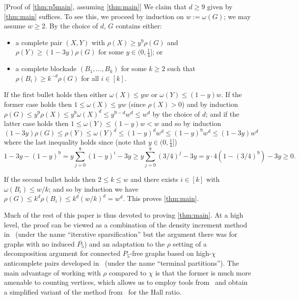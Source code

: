 \documentclass[11pt,reqno]{amsart}
\let\oldendproof\endproof
\renewenvironment{proof}[1][\proofname]{%
	\oldproof[\normalfont\bfseries #1]%
}{\oldendproof}
\begin{document}
	\begin{proof}
		[Proof of \cref{thm:p5main}, assuming \cref{thm:main}]
		We claim that $d\ge9$ given by \cref{thm:main} suffices.
		To see this, we proceed by induction on $w:=\omega(G)$; we may assume $w\ge2$.
		By the choice of $d$, $G$ contains either:
		\begin{itemize}
			\item a complete pair $(X,Y)$ with $\rho(X)\ge y^9\rho(G)$ and $\rho(Y)\ge(1-3y)\rho(G)$ for some $y\in(0,\frac14]$; or
			
			\item a complete blockade $(B_1,\ldots,B_k)$ for some $k\ge2$ such that $\rho(B_i)\ge k^{-d}\rho(G)$ for all $i\in[k]$.
		\end{itemize}
		
		If the first bullet holds then either $\omega(X)\le yw$ or $\omega(Y)\le(1-y)w$. If the former case holds then $1\le \omega(X)\le yw$ (since $\rho(X)>0$) and by induction $\rho(G)\le y^9\rho(X)\le y^9\omega(X)^d\le y^{9-d}w^d\le w^d$ by the choice of $d$;
		and if the latter case holds then $1\le\omega(Y)\le(1-y)w<w$ and so by induction
		\[(1-3y)\rho(G)\le \rho(Y)\le \omega(Y)^d\le (1-y)^dw^d\le (1-y)^9w^d\le (1-3y)w^d\]
		where the last inequality holds since (note that $y\in(0,\frac14]$)
		\[1-3y-(1-y)^9=y\sum_{j=0}^8(1-y)^i-3y
		\ge y\sum_{j=0}^8(3/4)^j-3y
		=y\cdot4(1-(3/4)^9)-3y\ge0.\]
		
		If the second bullet holds then $2\le k\le w$ and there exists $i\in[k]$ with $\omega(B_i)\le w/k$; and so by induction we have
		$\rho(G)\le k^d\rho(B_i)\le k^d(w/k)^d= w^d$.
		This proves \cref{thm:main}.
	\end{proof}
	
	Much of the rest of this paper is thus devoted to proving \cref{thm:main}.
	At a high level, the proof can be viewed as a combination of the density increment method in~\cite[Section 7]{density7} (under the name ``iterative sparsification'' but the argument there was for graphs with no induced  $\overline{P_5}$) and an adaptation to the $\rho$ setting of a decomposition argument for connected $P_5$-free graphs based on high-$\chi$ anticomplete pairs developed in~\cite[Section 4]{2024p5} (under the name ``terminal partitions'').
	The main advantage of working with $\rho$ compared to $\chi$ is that the former is much more amenable to counting vertices, which allows us to employ tools from~\cite{density7} and obtain a simplified variant of the method from~\cite{2024p5} for the Hall ratio.
	
\end{document}
